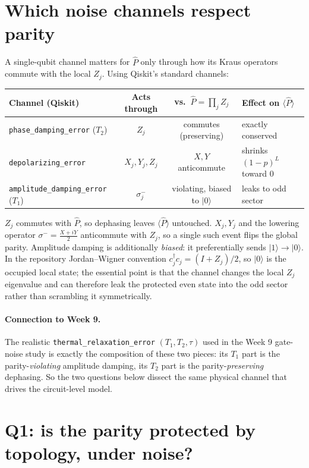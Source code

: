 \documentclass[11pt]{article}
\newcommand{\ket}[1]{|#1\rangle}
\newcommand{\Pop}{\hat{P}}
\newcommand{\expv}[1]{\langle #1\rangle}
\begin{document}
\section{Which noise channels respect parity}

A single-qubit channel matters for $\Pop$ only through how its Kraus operators
commute with the local $Z_j$. Using Qiskit's standard channels:
\begin{center}
\begin{tabular}{lccl}
\toprule
Channel (Qiskit) & Acts through & vs.\ $\Pop=\prod_j Z_j$ & Effect on $\expv{\Pop}$\\
\midrule
\texttt{phase\_damping\_error} ($T_2$) & $Z_j$ & commutes (preserving) & exactly conserved\\
\texttt{depolarizing\_error} & $X_j,Y_j,Z_j$ & $X,Y$ anticommute & shrinks $(1-p)^L$ toward $0$\\
\texttt{amplitude\_damping\_error} ($T_1$) & $\sigma^-_j$ & violating, biased to $\ket0$ & leaks to odd sector\\
\bottomrule
\end{tabular}
\end{center}
$Z_j$ commutes with $\Pop$, so dephasing leaves $\expv{\Pop}$ untouched. $X_j,Y_j$
and the lowering operator $\sigma^-=\tfrac{X+iY}{2}$ anticommute with $Z_j$, so a
single such event flips the global parity. Amplitude damping is additionally
\emph{biased}: it preferentially sends $\ket1\to\ket0$. In the repository
Jordan--Wigner convention $c_j^\dagger c_j=(I+Z_j)/2$, so $\ket0$ is the
occupied local state; the essential point is that the channel changes the local
$Z_j$ eigenvalue and can therefore leak the protected even state into the odd
sector rather than scrambling it symmetrically.

\paragraph{Connection to Week 9.} The realistic \texttt{thermal\_relaxation\_error}
$(T_1,T_2,\tau)$ used in the Week 9 gate-noise study is exactly the composition of
these two pieces: its $T_1$ part is the parity-\emph{violating} amplitude damping,
its $T_2$ part is the parity-\emph{preserving} dephasing. So the two questions
below dissect the same physical channel that drives the circuit-level model.

\section{Q1: is the parity protected by topology, under noise?}
\end{document}
